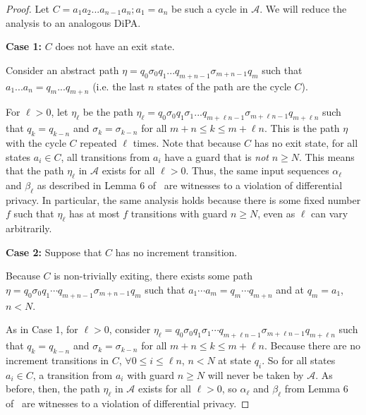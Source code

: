 \documentclass[12pt]{article}
\theoremstyle{definition}
\begin{document}
\begin{proof} 

Let $C = a_1a_2...a_{n-1}a_n; a_1=a_n$ be such a cycle in $\mathcal{A}$. We will reduce the analysis to an analogous DiPA.

\textbf{Case 1:} $C$ does not have an exit state.

Consider an abstract path $\eta = q_0\sigma_0q_1...q_{m+n-1}\sigma_{m+n-1}q_m$ such that $a_1...a_n=q_m...q_{m+n}$ (i.e. the last $n$ states of the path are the cycle $C$). 

For $\ell > 0$, let $\eta_\ell$ be the path $\eta_\ell = q_0\sigma_0q_1\sigma_1...q_{m+\ell n-1}\sigma_{m+\ell n-1}q_{m+\ell n}$ such that $q_k = q_{k-n}$ and $\sigma_k = \sigma_{k-n}$ for all $m+n\leq k\leq m + \ell n$. This is the path $\eta$ with the cycle $C$ repeated $\ell$ times. 
Note that because $C$ has no exit state, for all states $a_i\in C$, all transitions from $a_i$ have a guard that is \textit{not} $n\geq N$. This means that the path $\eta_\ell$ in $\mathcal{A}$ exists for all $\ell>0$. 
Thus, the same input sequences $\alpha_\ell$ and $\beta_\ell$ as described in Lemma 6 of~\cite{chadhaLinearTimeDecidability2021} are witnesses to a violation of differential privacy. In particular, the same analysis holds because there is some fixed number $f$ such that $\eta_\ell$ has at most $f$ transitions with guard $n\geq N$, even as $\ell$ can vary arbitrarily.

\textbf{Case 2:} Suppose that $C$ has no increment transition.

Because $C$ is non-trivially exiting, there exists some path $\eta = q_0\sigma_0q_1\cdots q_{m+n-1}\sigma_{m+n-1}q_m$ such that $a_1\cdots a_m = q_m\cdots q_{m+n}$ and at $q_m = a_1$, $n < N$.

As in Case 1, for $\ell > 0$, consider $\eta_\ell = q_0\sigma_0q_1\sigma_1\cdots q_{m+\ell n-1}\sigma_{m+\ell n-1}q_{m+\ell n}$ such that $q_k = q_{k-n}$ and $\sigma_k = \sigma_{k-n}$ for all $m+n\leq k\leq m + \ell n$. 
Because there are no increment transitions in $C$, $\forall 0\leq i\leq \ell n$, $n<N$ at state $q_i$. So for all states $a_i\in C$, a transition from $a_i$ with guard $n\geq N$ will never be taken by $\mathcal{A}$. As before, then, the path $\eta_\ell$ in $\mathcal{A}$ exists for all $\ell > 0$, so $\alpha_\ell$ and $\beta_\ell$ from Lemma 6 of~\cite{chadhaLinearTimeDecidability2021} are witnesses to a violation of differential privacy.

\end{proof}
\end{document}
